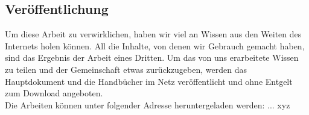 \subsection{Veröffentlichung}
Um diese Arbeit zu verwirklichen, haben wir viel an Wissen aus den Weiten des Internets holen können. All die Inhalte, von denen wir Gebrauch gemacht haben, sind das Ergebnis der Arbeit eines Dritten. Um das von uns erarbeitete Wissen zu teilen und der Gemeinschaft etwas zurückzugeben, werden das Hauptdokument und die Handbücher im Netz veröffentlicht und ohne Entgelt zum Download angeboten.
\\
Die Arbeiten können unter folgender Adresse heruntergeladen werden: ... xyz
